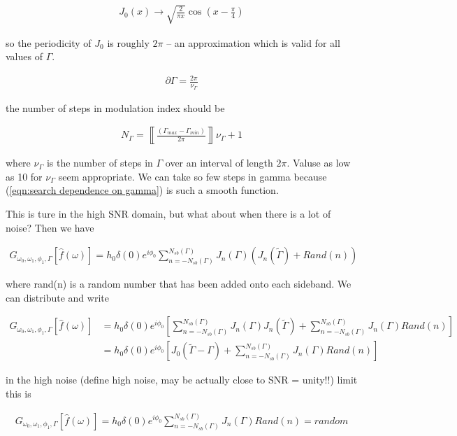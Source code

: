 \documentclass[onecolumn, groupedaddress, 10pt]{revtex4-1}
\begin{document}
\begin{align}
J_0(x) \to \sqrt{\frac{2}{\pi x}} \cos \left( x - \frac{\pi}{4} \right)
\end{align}

so the periodicity of $J_0$ is roughly $2\pi$ -- an approximation which is valid for all values of $\Gamma$.  

\begin{align}
\boxed{
\partial \Gamma = \frac{2\pi}{\nu_{\Gamma}}
}
\end{align}

the number of steps in modulation index should be

\begin{align}
\boxed{
N_\Gamma = \left\llbracket \frac{(\Gamma_{max} - \Gamma_{min})}{2\pi} \right\rrbracket \nu_\Gamma + 1
}
\end{align}

where $\nu_\Gamma$ is the number of steps in $\Gamma$ over an interval of length $2\pi$.  Valuse as low as 10 for $\nu_\Gamma$ seem appropriate.  We can take so few steps in gamma because (\ref{eqn:search dependence on gamma}) is such a smooth function.


This is ture in the high SNR domain, but what about when there is a lot of noise?  Then we have

\begin{align}
G_{\omega_0,\omega_1,\phi_1,\Gamma} \left[ \hat{f}(\omega) \right] = 
h_0 \delta(0) e^{i\phi_0} \sum_{n=-N_{sb}(\Gamma)}^{N_{sb}(\Gamma)} J_n (\Gamma)(J_n(\widetilde{\Gamma}) + Rand(n))
\end{align}

where rand(n) is a random number that has been added onto each sideband.  We can distribute and write

\begin{align}
G_{\omega_0,\omega_1,\phi_1,\Gamma} \left[ \hat{f}(\omega) \right] 
&= h_0 \delta(0) e^{i\phi_0} \left[ 
	  \sum_{n=-N_{sb}(\Gamma)}^{N_{sb}(\Gamma)} J_n (\Gamma) J_n(\widetilde{\Gamma})
	+ \sum_{n=-N_{sb}(\Gamma)}^{N_{sb}(\Gamma)} J_n (\Gamma) Rand(n)
\right]																					\\
&= h_0 \delta(0) e^{i\phi_0} \left[ 
	  J_0(\widetilde{\Gamma} - \Gamma)
	+ \sum_{n=-N_{sb}(\Gamma)}^{N_{sb}(\Gamma)} J_n (\Gamma) Rand(n)
\right]
\end{align}

in the high noise (define high noise, may be actually close to SNR = unity!!) limit this is 

\begin{align}
G_{\omega_0,\omega_1,\phi_1,\Gamma} \left[ \hat{f}(\omega) \right] =
h_0 \delta(0) e^{i\phi_0} \sum_{n=-N_{sb}(\Gamma)}^{N_{sb}(\Gamma)} J_n (\Gamma) Rand(n)
= random
\end{align}
\end{document}
